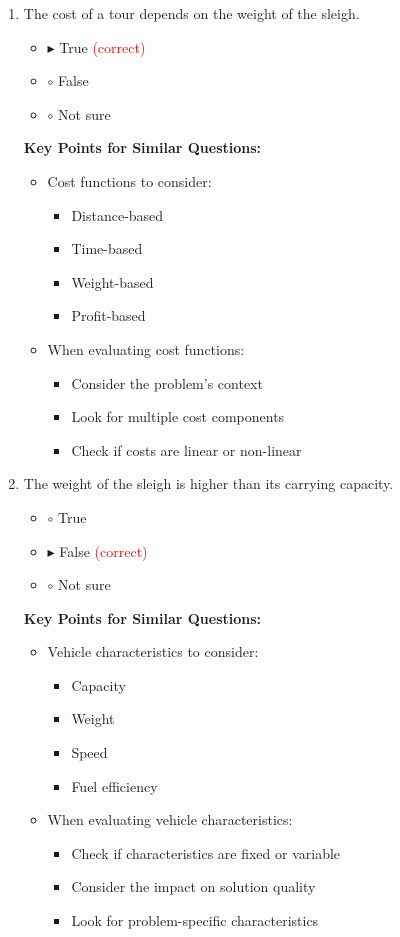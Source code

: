 \begin{enumerate}[label=\alph*)]
\item The cost of a tour depends on the weight of the sleigh.
\begin{itemize}
\item $\blacktriangleright$ True \hspace{1em} \textcolor{red}{(correct)}
\item $\circ$ False
\item $\circ$ Not sure
\end{itemize}

\textbf{Key Points for Similar Questions:}
\begin{itemize}
\item Cost functions to consider:
  \begin{itemize}
  \item Distance-based
  \item Time-based
  \item Weight-based
  \item Profit-based
  \end{itemize}
\item When evaluating cost functions:
  \begin{itemize}
  \item Consider the problem's context
  \item Look for multiple cost components
  \item Check if costs are linear or non-linear
  \end{itemize}
\end{itemize}

\item The weight of the sleigh is higher than its carrying capacity.
\begin{itemize}
\item $\circ$ True
\item $\blacktriangleright$ False \hspace{1em} \textcolor{red}{(correct)}
\item $\circ$ Not sure
\end{itemize}

\textbf{Key Points for Similar Questions:}
\begin{itemize}
\item Vehicle characteristics to consider:
  \begin{itemize}
  \item Capacity
  \item Weight
  \item Speed
  \item Fuel efficiency
  \end{itemize}
\item When evaluating vehicle characteristics:
  \begin{itemize}
  \item Check if characteristics are fixed or variable
  \item Consider the impact on solution quality
  \item Look for problem-specific characteristics
  \end{itemize}
\end{itemize}


\end{enumerate}
